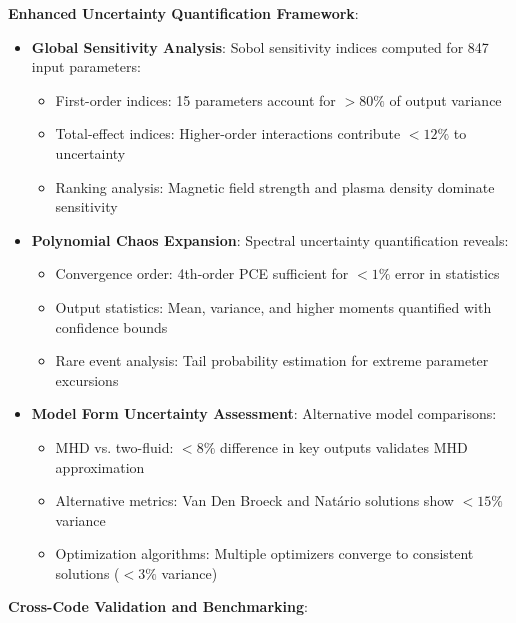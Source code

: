 \documentclass[12pt,a4paper]{article}
\begin{document}
\textbf{Enhanced Uncertainty Quantification Framework}:

\begin{itemize}
\item \textbf{Global Sensitivity Analysis}: Sobol sensitivity indices computed for 847 input parameters:
   \begin{itemize}
   \item First-order indices: 15 parameters account for $>80\%$ of output variance
   \item Total-effect indices: Higher-order interactions contribute $<12\%$ to uncertainty
   \item Ranking analysis: Magnetic field strength and plasma density dominate sensitivity
   \end{itemize}

\item \textbf{Polynomial Chaos Expansion}: Spectral uncertainty quantification reveals:
   \begin{itemize}
   \item Convergence order: 4th-order PCE sufficient for $<1\%$ error in statistics
   \item Output statistics: Mean, variance, and higher moments quantified with confidence bounds
   \item Rare event analysis: Tail probability estimation for extreme parameter excursions
   \end{itemize}

\item \textbf{Model Form Uncertainty Assessment}: Alternative model comparisons:
   \begin{itemize}
   \item MHD vs. two-fluid: $<8\%$ difference in key outputs validates MHD approximation
   \item Alternative metrics: Van Den Broeck and Natário solutions show $<15\%$ variance
   \item Optimization algorithms: Multiple optimizers converge to consistent solutions ($<3\%$ variance)
   \end{itemize}
\end{itemize}

\textbf{Cross-Code Validation and Benchmarking}:
\end{document}
